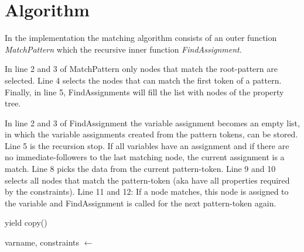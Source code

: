 \documentclass[english]{article}
\begin{document}
\section{Algorithm}

In the implementation the matching algorithm consists of an outer function \textit{MatchPattern} which the recursive inner function \textit{FindAssignment}.

In line 2 and 3 of MatchPattern only nodes that match the root-pattern are selected. Line 4 selects the nodes that can match the first token of a pattern. Finally, in line 5, FindAssignments will fill the list with nodes of the property tree.

\begin{algorithm}[H]
\SetAlgoLined
{}
\Fn{\MatchPattern(\root, \rootpattern, \pattern)}
{


}
\end{algorithm}

In line 2 and 3 of FindAssignment the variable assignment becomes an empty list, in which the variable assignments created from the pattern tokens, can be stored. Line 5 is the recursion stop. If all variables have an assignment and if there are no immediate-followers to the last matching node, the current assignment is a match. Line 8 picks the data from the current pattern-token. Line 9 and 10 selects all nodes that match the pattern-token (aka have all properties required by the constraints). Line 11 and 12: If a node matches, this node is assigned to the variable and FindAssignment is called for the next pattern-token again.

\begin{algorithm}[H]
\SetAlgoLined
{}
{
  {
    yield copy(\assignment)
  }{
    varname, constraints $\leftarrow$ \pattern[\index]

  } 
}
\end{algorithm}
\end{document}
